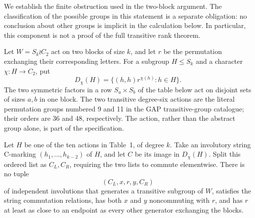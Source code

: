 We establish the finite obstruction used in the two-block argument.
The classification of the possible groups in this statement is a
separate obligation: no conclusion about other groups is implicit in
the calculation below. In particular, this component is not a proof
of the full transitive rank theorem.

Let $W=S_k\wr C_2$ act on two blocks of size $k$, and let $r$ be the
permutation exchanging their corresponding letters. For a subgroup
$H\leq S_k$ and a character $\chi:H\to C_2$, put
\[
 D_\chi(H)=\{(h,h)r^{\chi(h)}:h\in H\}.
\]
The two symmetric factors in a row $S_a\times S_b$ of the table below
act on disjoint sets of sizes $a,b$ in one block. The two transitive
degree-six actions are the literal permutation groups numbered 9
and 11 in the GAP transitive-group catalogue; their orders are 36
and 48, respectively. The action, rather than the abstract group
alone, is part of the specification.

\begin{lemma}\label{boundary}
Let $H$ be one of the ten actions in Table~1, of degree $k$.
Take an involutory string C-marking $(h_1,\ldots,h_{k-2})$
of $H$, and let $C$ be its image in $D_\chi(H)$. Split this ordered
list as $C_L,C_R$, requiring the two lists to commute elementwise.
There is no tuple
\[
                  (C_L,x,r,y,C_R)
\]
of independent involutions that generates a transitive subgroup of
$W$, satisfies the string commutation relations, has both $x$ and
$y$ noncommuting with $r$, and has $r$ at least as close to an
endpoint as every other generator exchanging the blocks.
\end{lemma}


